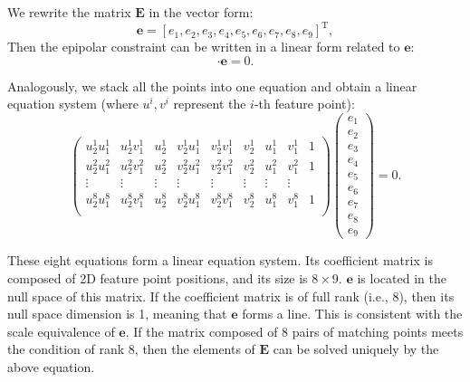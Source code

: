 We rewrite the matrix $\mathbf{E}$ in the vector form:
\[
\mathbf{e}= [e_{1},e_{2},e_{3},e_{4},e_{5},e_{6},e_{7},e_{8},e_{9}]^{\mathrm{T}},
\]
Then the epipolar constraint can be written in a linear form related to $\mathbf{e}$:
\begin{equation}
[u_{2}u_{1},u_{2}v_{1},u_{2},v_{2}u_{1},v_{2}v_{1},v_{2},u_{1},v_{1},1] \cdot  \mathbf{e}=0.
\end{equation}

Analogously, we stack all the points into one equation and obtain a linear equation system (where $u^i, v^i$ represent the $i$-th feature point): 
\begin{equation}
\label{Eq:eight-point}
\begin{pmatrix}
u_{2}^{1}u_{1}^{1}& u_{2}^{1}v_{1}^{1}& u_{2}^{1}& v_{2}^{1}u_{1}^{1}& v_{2}^{1}v_{1}^{1}& v_{2}^{1} &u_{1}^{1} &v_{1}^{1}&1\\
u_{2}^{2}u_{1}^{2}& u_{2}^{2}v_{1}^{2}& u_{2}^{2}& v_{2}^{2}u_{1}^{2}& v_{2}^{2}v_{1}^{2}& v_{2}^{2} &u_{1}^{2} &v_{1}^{2}&1\\
\vdots & \vdots & \vdots & \vdots & \vdots & \vdots & \vdots & \vdots \\
u_{2}^{8}u_{1}^{8}& u_{2}^{8}v_{1}^{8}& u_{2}^{8}& v_{2}^{8}u_{1}^{8}& v_{2}^{8}v_{1}^{8}& v_{2}^{8} &u_{1}^{8}&v_{1}^{8}&1\\
\end{pmatrix}
\begin{pmatrix}
e_{1}\\ e_{2}\\ e_{3}\\  e_{4}\\ e_{5}\\ e_{6}\\ e_{7}\\ e_{8}\\ e_{9}  
\end{pmatrix}
=0.
\end{equation}


These eight equations form a linear equation system. Its coefficient matrix is composed of 2D feature point positions, and its size is $8 \times 9$. $\mathbf{e}$ is located in the null space of this matrix. If the coefficient matrix is of full rank (i.e., 8), then its null space dimension is 1, meaning that $\mathbf{e}$ forms a line. This is consistent with the scale equivalence of $\mathbf{e}$. If the matrix composed of 8 pairs of matching points meets the condition of rank 8, then the elements of $\mathbf{E}$ can be solved uniquely by the above equation.


